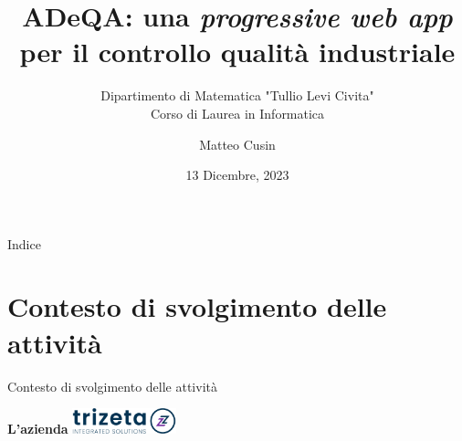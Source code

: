 \documentclass{beamer}
\title{\textbf{ADeQA: una \textit{progressive web app} per il controllo qualità industriale}}
\subtitle{Dipartimento di Matematica "Tullio Levi Civita" \\ Corso di Laurea in Informatica}
\author{Matteo Cusin}
\date{13 Dicembre, 2023}
\begin{document}
\setcounter{framenumber}{-2}
	\maketitle
	\begin{frame}{Indice}
		\tableofcontents 
	\end{frame}

	\setcounter{framenumber}{0}

	\section{Contesto di svolgimento delle attività} 
	\begin{frame}{Contesto di svolgimento delle attività}

		{\LARGE \textbf{L'azienda}} \hspace*{0.7\textwidth} \includegraphics[width=3cm]{images/logo_azienda.png}
		\vspace{1cm}
		\hspace{-1cm}
	

\end{frame}
\end{document}
